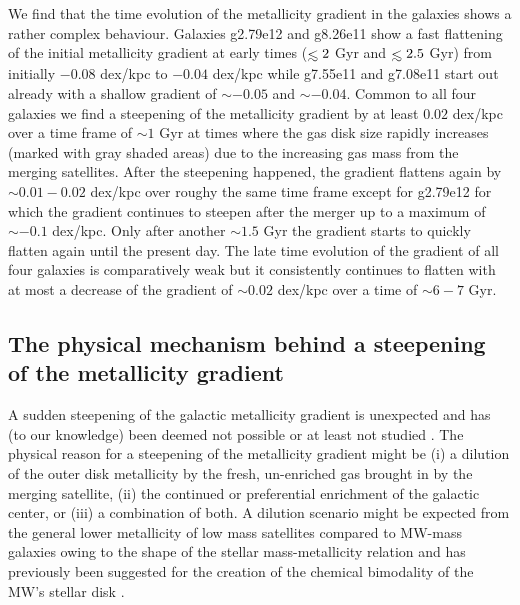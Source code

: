 \documentclass[useAMS,usenatbib]{mnras}
\def\lesssim{\mathrel{\hbox{\rlap{\hbox{\lower4pt\hbox{$\sim$}}}\hbox{$<$}}}}
\begin{document}
We find that the time evolution of the metallicity gradient in the galaxies shows a rather complex behaviour. Galaxies g2.79e12 and g8.26e11 show a fast flattening of the initial metallicity gradient at early times ($\lesssim2$ Gyr and $\lesssim 2.5$ Gyr) from initially $-0.08$ dex/kpc to $-0.04$ dex/kpc while g7.55e11 and g7.08e11 start out already with a shallow gradient of $\sim-0.05$ and $\sim-0.04$.
Common to all four galaxies we find a steepening of the metallicity gradient by at least $0.02$ dex/kpc over a time frame of $\sim1$ Gyr at times where the gas disk size rapidly increases (marked with gray shaded areas) due to the increasing gas mass from the merging satellites. After the steepening happened, the gradient flattens again by $\sim0.01-0.02$ dex/kpc over roughy the same time frame except for g2.79e12 for which the gradient continues to steepen after the merger up to a maximum of $\sim-0.1$ dex/kpc. Only after another $\sim1.5$ Gyr the gradient starts to quickly flatten again until the present day. The late time evolution of the gradient of all four galaxies is comparatively weak but it consistently continues to flatten with at most a decrease of the gradient of $\sim0.02$ dex/kpc over a time of $\sim6-7$ Gyr.

\subsection{The physical mechanism behind a steepening of the metallicity gradient}
\label{sec:steepening}

A sudden steepening of the galactic metallicity gradient is unexpected and has (to our knowledge) been deemed not possible or at least not studied \citep[e.g.][for an extensive study]{Chiappini2001}. The physical reason for a steepening of the metallicity gradient might be (i) a dilution of the outer disk metallicity by the fresh, un-enriched gas brought in by the merging satellite, (ii) the continued or preferential enrichment of the galactic center, or (iii) a combination of both. A dilution scenario might be expected from the general lower metallicity of low mass satellites compared to MW-mass galaxies owing to the shape of the stellar mass-metallicity relation and has previously been suggested for the creation of the chemical bimodality of the MW's stellar disk \citep[e.g.][]{Chiappini1997, Spitoni2019, Buck2020}.
\end{document}
